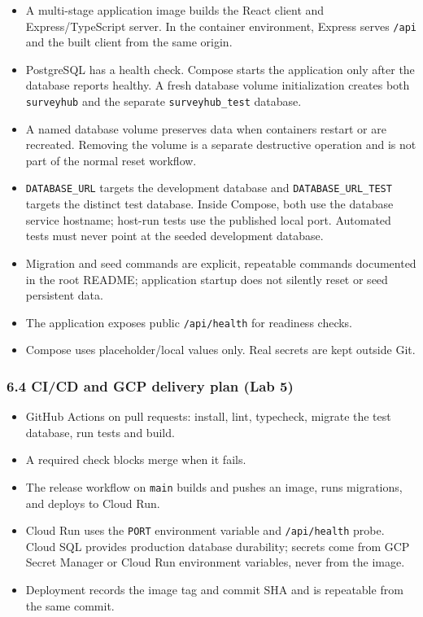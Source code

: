 \documentclass[12pt,a4paper]{article}
\begin{document}
\begin{itemize}[leftmargin=*]
\item A multi-stage application image builds the React client and Express/TypeScript server. In the container environment, Express serves \texttt{/api} and the built client from the same origin.
\item PostgreSQL has a health check. Compose starts the application only after the database reports healthy. A fresh database volume initialization creates both \texttt{surveyhub} and the separate \texttt{surveyhub\_test} database.
\item A named database volume preserves data when containers restart or are recreated. Removing the volume is a separate destructive operation and is not part of the normal reset workflow.
\item \texttt{DATABASE\_URL} targets the development database and \texttt{DATABASE\_URL\_TEST} targets the distinct test database. Inside Compose, both use the database service hostname; host-run tests use the published local port. Automated tests must never point at the seeded development database.
\item Migration and seed commands are explicit, repeatable commands documented in the root README; application startup does not silently reset or seed persistent data.
\item The application exposes public \texttt{/api/health} for readiness checks.
\item Compose uses placeholder/local values only. Real secrets are kept outside Git.
\end{itemize}

\subsubsection*{6.4 CI/CD and GCP delivery plan (Lab 5)}
\begin{itemize}[leftmargin=*]
\item GitHub Actions on pull requests: install, lint, typecheck, migrate the test database, run tests and build.
\item A required check blocks merge when it fails.
\item The release workflow on \texttt{main} builds and pushes an image, runs migrations, and deploys to Cloud Run.
\item Cloud Run uses the \texttt{PORT} environment variable and \texttt{/api/health} probe. Cloud SQL provides production database durability; secrets come from GCP Secret Manager or Cloud Run environment variables, never from the image.
\item Deployment records the image tag and commit SHA and is repeatable from the same commit.
\end{itemize}
\end{document}
